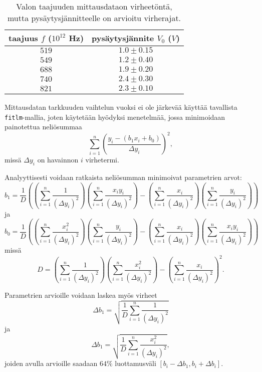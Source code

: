 \documentclass[a4paper,11pt]{article}
\begin{document}
{\begin{table}[!htb]
    \centering
    \begin{tabular}{|c|c|}
    \hline
    taajuus $f$ ($10^{12}$ Hz) & pysäytysjännite $V_0$ ($V$) \\
    \hline
$519$ & $1.0 \pm 0.15$ \\
$549$ & $1.2 \pm 0.40$ \\
$688$ & $1.9 \pm 0.20$ \\
$740$ & $2.4 \pm 0.30$ \\
$821$ & $2.3 \pm 0.10$ \\
    \hline
    \end{tabular}
    \caption{Valon taajuuden mittausdataon virheetöntä, mutta pysäytysjännitteelle on arvioitu virherajat.}
    \label{table:t3}
\end{table}

Mittausdatan tarkkuuden vaihtelun vuoksi ei ole järkevää käyttää tavallista \texttt{fitlm}-mallia, joten käytetään hyödyksi menetelmää, jossa minimoidaan painotettua neliösummaa
\begin{equation}
    \sum_{i=1}^n(\frac{y_i-(b_1x_i+b_0)}{\Delta y_i})^2,
\end{equation}
missä $\Delta y_i$ on havainnon $i$ virhetermi.

Analyyttisesti voidaan ratkaista neliösumman minimoivat parametrien arvot:
\begin{equation}
    b_1 = \frac{1}{D} ((\sum_{i=1}^n\frac{1}{(\Delta y_i)^2}) (\sum_{i=1}^n\frac{x_iy_i}{(\Delta y_i)^2}) - (\sum_{i=1}^n\frac{x_i}{(\Delta y_i)^2}) (\sum_{i=1}^n\frac{y_i}{(\Delta y_i)^2}))
\end{equation}
ja
\begin{equation}
    b_0 = \frac{1}{D} ((\sum_{i=1}^n\frac{x_i^2}{(\Delta y_i)^2}) (\sum_{i=1}^n\frac{y_i}{(\Delta y_i)^2}) - (\sum_{i=1}^n\frac{x_i}{(\Delta y_i)^2}) (\sum_{i=1}^n\frac{x_iy_i}{(\Delta y_i)^2}))
\end{equation}
missä
\begin{equation}
    D = (\sum_{i=1}^n\frac{1}{(\Delta y_i)^2}) (\sum_{i=1}^n\frac{x_i^2}{(\Delta y_i)^2}) - (\sum_{i=1}^n\frac{x_i}{(\Delta y_i)^2})^2.
\end{equation}

Parametrien arvioille voidaan laskea myös virheet
\begin{equation}
    \Delta b_1 = \sqrt{\frac{1}{D} \sum_{i=1}^n\frac{1}{(\Delta y_i)^2}}
\end{equation}
ja
\begin{equation}
    \Delta b_1 = \sqrt{\frac{1}{D} \sum_{i=1}^n\frac{x_i^2}{(\Delta y_i)^2}},
\end{equation}
joiden avulla arvioille saadaan $64\%$ luottamusväli $[b_i - \Delta b_1, b_i + \Delta b_i]$.

}
\end{document}
